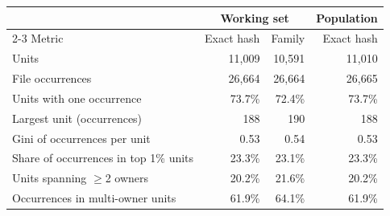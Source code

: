 \begin{tabular}{lrrr}
\toprule
 & \multicolumn{2}{c}{Working set} & Population \\
\cmidrule(lr){2-3}
Metric & Exact hash & Family & Exact hash \\
\midrule
Units & 11,009 & 10,591 & 11,010 \\
File occurrences & 26,664 & 26,664 & 26,665 \\
Units with one occurrence & 73.7\% & 72.4\% & 73.7\% \\
Largest unit (occurrences) & 188 & 190 & 188 \\
Gini of occurrences per unit & 0.53 & 0.54 & 0.53 \\
Share of occurrences in top 1\% units & 23.3\% & 23.1\% & 23.3\% \\
Units spanning $\geq$2 owners & 20.2\% & 21.6\% & 20.2\% \\
Occurrences in multi-owner units & 61.9\% & 64.1\% & 61.9\% \\
\bottomrule
\end{tabular}
